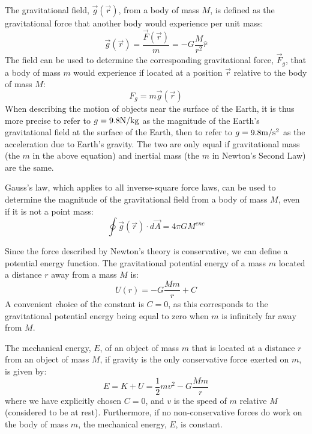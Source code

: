 The gravitational field, $\vec g(\vec r)$, from a body of mass $M$, is defined as the gravitational force that another body would experience per unit mass:
\begin{equation}
\vec g(\vec r)=\frac{\vec F(\vec r)}{m}=-G\frac{M}{r^2}\hat r
\end{equation}
The field can be used to determine the corresponding gravitational force, $\vec F_g$, that a body of mass $m$ would experience if located at a position $\vec r$ relative to the body of mass $M$:
\begin{equation}
F_g = m \vec g(\vec r)
\end{equation}
When describing the motion of objects near the surface of the Earth, it is thus more precise to refer to $g=9.8 {\rm N/kg}$ as the magnitude of the Earth's gravitational field at the surface of the Earth, then to refer to $g=9.8 {\rm m/s^2}$ as the acceleration due to Earth's gravity. The two are only equal if gravitational mass (the $m$ in the above equation) and inertial mass (the $m$ in Newton's Second Law) are the same.

Gauss's law, which applies to all inverse-square force laws, can be used to determine the magnitude of the gravitational field from a body of mass $M$, even if it is not a point mass:
\begin{equation}
\oint \vec g(\vec r) \cdot d\vec A = 4\pi G M^{enc}
\end{equation}

Since the force described by Newton's theory is conservative, we can define a potential energy function. The gravitational potential energy of a mass $m$ located a distance $r$ away from a mass $M$ is:
\begin{equation}
U(r) = -G\frac{Mm}{r} + C
\end{equation}
A convenient choice of the constant is $C=0$, as this corresponds to the gravitational potential energy being equal to zero when $m$ is infinitely far away from $M$.

The mechanical energy, $E$, of an object of mass $m$ that is located at a distance $r$ from an object of mass $M$, if gravity is the only conservative force exerted on $m$, is given by:
\begin{equation}
E = K + U = \frac{1}{2}mv^2 - G\frac{Mm}{r}
\end{equation}
where we have explicitly chosen $C=0$, and $v$ is the speed of $m$ relative $M$ (considered to be at rest). Furthermore, if no non-conservative forces do work on the body of mass $m$, the mechanical energy, $E$, is constant.

